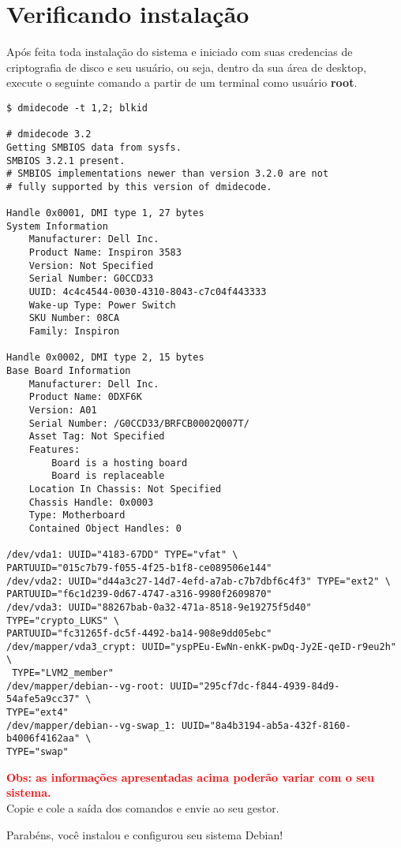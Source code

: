 \section{Verificando instalação} \label{sec:verify}
Após feita toda instalação do sistema e iniciado com suas credencias
de criptografia de disco e seu usuário, ou seja, dentro da sua área de
desktop, execute o seguinte comando a partir de um terminal como
usuário \textbf{root}.

\begin{verbatim}
$ dmidecode -t 1,2; blkid

# dmidecode 3.2
Getting SMBIOS data from sysfs.
SMBIOS 3.2.1 present.
# SMBIOS implementations newer than version 3.2.0 are not
# fully supported by this version of dmidecode.

Handle 0x0001, DMI type 1, 27 bytes
System Information
	Manufacturer: Dell Inc.
	Product Name: Inspiron 3583
	Version: Not Specified
	Serial Number: G0CCD33
	UUID: 4c4c4544-0030-4310-8043-c7c04f443333
	Wake-up Type: Power Switch
	SKU Number: 08CA
	Family: Inspiron

Handle 0x0002, DMI type 2, 15 bytes
Base Board Information
	Manufacturer: Dell Inc.
	Product Name: 0DXF6K
	Version: A01
	Serial Number: /G0CCD33/BRFCB0002Q007T/
	Asset Tag: Not Specified
	Features:
		Board is a hosting board
		Board is replaceable
	Location In Chassis: Not Specified
	Chassis Handle: 0x0003
	Type: Motherboard
	Contained Object Handles: 0

/dev/vda1: UUID="4183-67DD" TYPE="vfat" \
PARTUUID="015c7b79-f055-4f25-b1f8-ce089506e144"
/dev/vda2: UUID="d44a3c27-14d7-4efd-a7ab-c7b7dbf6c4f3" TYPE="ext2" \
PARTUUID="f6c1d239-0d67-4747-a316-9980f2609870"
/dev/vda3: UUID="88267bab-0a32-471a-8518-9e19275f5d40" TYPE="crypto_LUKS" \
PARTUUID="fc31265f-dc5f-4492-ba14-908e9dd05ebc"
/dev/mapper/vda3_crypt: UUID="yspPEu-EwNn-enkK-pwDq-Jy2E-qeID-r9eu2h" \
 TYPE="LVM2_member"
/dev/mapper/debian--vg-root: UUID="295cf7dc-f844-4939-84d9-54afe5a9cc37" \
TYPE="ext4"
/dev/mapper/debian--vg-swap_1: UUID="8a4b3194-ab5a-432f-8160-b4006f4162aa" \
TYPE="swap"
\end{verbatim}
 
\textcolor{red}{\textbf{Obs: as informações apresentadas acima poderão variar com o seu sistema.}}\\

Copie e cole a saída dos comandos e envie ao seu gestor.

Parabéns, você instalou e configurou seu sistema Debian!